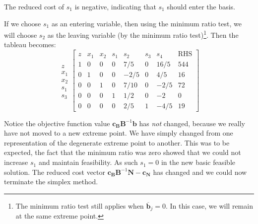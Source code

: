 \begin{example}
\begin{enumerate*}
\item The reduced cost of $s_1$ is negative, indicating that $s_1$ should enter the basis. 
\end{enumerate*}
If we choose $s_1$ as an entering variable, then using the minimum ratio test, we will choose $s_2$ as the leaving variable (by the minimum ratio test)\footnote{The minimum ratio test still applies when $\overline{\mathbf{b}}_{j} = 0$. In this case, we will remain at the same extreme point.}.   
Then the tableau becomes:
\begin{equation}
\begin{array}{c}
\\
z\\
x_1\\
x_2\\
s_1\\
s_3
\end{array}
\left[
\begin{array}{c|cccccc|c}
z& x_1 & x_2 & s_1 & s_2 & s_3 & s_4 &\text{RHS}\\
\hline
1 & 0 & 0 & 0 & 7/5 	& 0 & 16/5 & 544\\
\hline
0 & 1 & 0 & 0 & -2/5 		& 0  & 4/5 		& 16\\
0 & 0 & 1 & 0 & 7/10 		& 0  & -2/5 	& 72\\
0 & 0 & 0 & 1 & 1/2 		& 0  & -2 		& 0\\
0 & 0 & 0 & 0 & 2/5 		& 1  & -4/5 	& 19
\end{array}\right]
\end{equation}

Notice the objective function value $\mathbf{c_B}\mathbf{B}^{-1}\mathbf{b}$ has \textit{not} changed, because we really have not moved to a new extreme point. We have simply changed from one representation of the degenerate extreme point to another. This was to be expected, the fact that the minimum ratio was zero showed that we could not increase $s_1$ and maintain feasibility. As such $s_1 = 0$ in the new basic feasible solution. The reduced cost vector $\mathbf{c_B}\mathbf{B}^{-1}\mathbf{N} - \mathbf{c_N}$ has changed and we could now terminate the simplex method. 
\label{ex:ToyMakerDegenSimplex}
\end{example}

